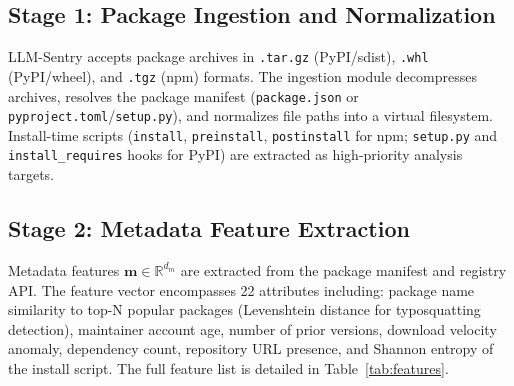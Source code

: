 \documentclass[conference]{IEEEtran}
\begin{document}
\subsection{Stage 1: Package Ingestion and Normalization}

LLM-Sentry accepts package archives in \texttt{.tar.gz} (PyPI/sdist), \texttt{.whl} (PyPI/wheel), and \texttt{.tgz} (npm) formats. The ingestion module decompresses archives, resolves the package manifest (\texttt{package.json} or \texttt{pyproject.toml}/\texttt{setup.py}), and normalizes file paths into a virtual filesystem. Install-time scripts (\texttt{install}, \texttt{preinstall}, \texttt{postinstall} for npm; \texttt{setup.py} and \texttt{install\_requires} hooks for PyPI) are extracted as high-priority analysis targets.

\subsection{Stage 2: Metadata Feature Extraction}

Metadata features $\mathbf{m} \in \mathbb{R}^{d_m}$ are extracted from the package manifest and registry API. The feature vector encompasses 22 attributes including: package name similarity to top-N popular packages (Levenshtein distance for typosquatting detection), maintainer account age, number of prior versions, download velocity anomaly, dependency count, repository URL presence, and Shannon entropy of the install script. The full feature list is detailed in Table~\ref{tab:features}.
\end{document}
